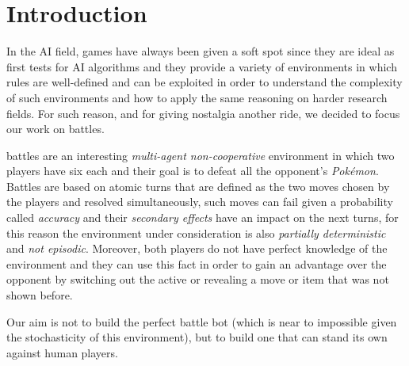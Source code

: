 \section{Introduction}\label{sec:introduction}
In the AI field, games have always been given a soft spot since they are ideal as first tests for AI algorithms and they provide a variety of environments
in which rules are well-defined and can be exploited in order to understand the complexity of such environments and how to apply the same reasoning on harder research fields. For such reason, and for giving nostalgia another ride, we decided to focus our work on \poke battles.

\poke battles are an interesting \textit{multi-agent non-cooperative} environment in which two players have six \poke each and their goal is to defeat all the opponent's \textit{Pokémon}. Battles are based on atomic turns that are defined as the two moves chosen by the players and resolved simultaneously, such moves can fail given a probability called \textit{accuracy} and their \textit{secondary effects} have an impact on the next turns, for this reason the environment under consideration is also \textit{partially deterministic} and \textit{not episodic}.
Moreover, both players do not have perfect knowledge of the environment and they can use this fact in order to gain an advantage over the opponent by switching out the active \poke or revealing a move or item that was not shown before.

Our aim is not to build the perfect \poke battle bot (which is near to impossible given the stochasticity of this environment), but to build one that can stand its own against human players.
